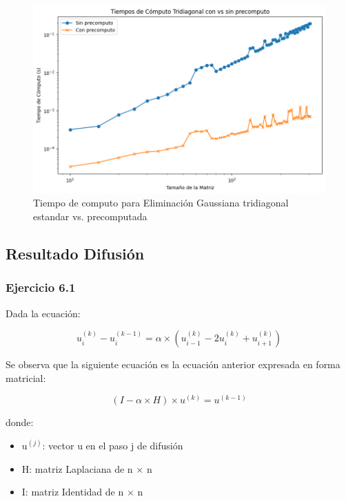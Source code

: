\begin{figure}[H]
\centerline{\includegraphics[scale=0.45]{./img/tiempos_tridiagConVsSinP.png}}
\caption{Tiempo de computo para Eliminación Gaussiana tridiagonal estandar vs. precomputada}
\label{result_ej5_2do}
\end{figure}


\subsection{Resultado Difusión}
\label{difusion}
\subsubsection{Ejercicio 6.1}
Dada la ecuación:

\begin{equation}
u_{i}^{(k)} - u_{i}^{(k-1)} = \alpha \times (u_{i-1}^{(k)} - 2u_{i}^{(k)} + u_{i+1}^{(k)})
\end{equation}

Se observa que la siguiente ecuación es la ecuación anterior expresada en forma matricial:

\begin{equation}
(I - \alpha \times H) \times u^{(k)} = u^{(k-1)}
\end{equation}

donde:

\begin{itemize}
  \item u$^{(j)}$: vector u en el paso j de difusión
  \item H: matriz Laplaciana de n $\times$ n
  \item I: matriz Identidad de n $\times$ n
\end{itemize}

